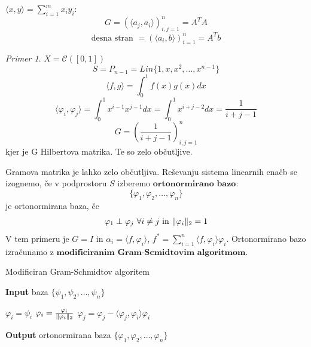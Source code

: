 \documentclass[a4paper,12pt]{article}
\DeclarePairedDelimiter\norm{\lVert}{\rVert}
\newcommand{\innerproduct}[2]{\langle #1, #2 \rangle}
\theoremstyle{definition}
\theoremstyle{remark}
\newtheorem*{ex}{Primer}
\begin{document}
$\innerproduct{x}{y} = \sum_{i = 1}^{m} x_i y_i$:
\begin{equation}
    G = (\innerproduct{a_j}{a_i})_{i, j = 1}^n = A^T A
\end{equation}
\begin{equation}
    \text{desna stran } = (\innerproduct{a_i}{b})_{i = 1}^n = A^Tb
\end{equation}

\begin{ex}
    $X = \mathscr{C} ([0, 1])$
    \begin{equation*}
        S = P_{n-1} = Lin\{1, x, x^2, \dots, x^{n-1}\}
    \end{equation*}
    \begin{equation*}
        \innerproduct{f}{g} = \int_{0}^{1} f(x) g(x) dx
    \end{equation*}
    \begin{equation*}
        \innerproduct{\varphi_i}{\varphi_j} = \int_{0}^{1} x^{i-1} x^{j-1} dx = \int_{0}^{1}x^{i+j-2} dx = \frac{1}{i+j-1}
    \end{equation*}
    \begin{equation*}
        G = (\frac{1}{i+j-1})_{i, j = 1}^n
    \end{equation*}
    kjer je G Hilbertova matrika. Te so zelo občutljive.
\end{ex}


Gramova matrika je lahko zelo občutljiva. Reševanju sistema linearnih enačb se izognemo, če v podprostoru $S$ izberemo $\textbf{ortonormirano bazo}$:
\begin{equation*}
    \{\varphi_1, \varphi_2, \dots, \varphi_n\}
\end{equation*}
je ortonormirana baza, če
\begin{equation*}
    \varphi_1 \perp \varphi_j \text{ } \forall i \neq j \text{ in } \norm{\varphi_i}_2 = 1
\end{equation*}
V tem primeru je $G = I$ in $\alpha_i = \innerproduct{f}{\varphi_i}$,  $f^* = \sum_{i = 1}^{n}\innerproduct{f}{\varphi_i} \varphi_i$. Ortonormirano
bazo izračunamo z $\textbf{modificiranim Gram-Scmidtovim algoritmom}$.

\begin{algorithm}
    \caption{Modificiran Gram-Schmidtov algoritem}\label{alg:mgs}
    \hspace*{\algorithmicindent} \textbf{Input} baza $\{\psi_1, \psi_2, \dots, \psi_n\}$
    \begin{algorithmic}[1]
            \State $\varphi_i = \psi_i$
        \EndFor
            \State $\varphi_i = \frac{\varphi_i}{\norm{\varphi_i}_2}$
                \State $\varphi_j = \varphi_j - \innerproduct{\varphi_j}{\varphi_i}\varphi_i$
            \EndFor
        \EndFor
    \end{algorithmic}
    \hspace*{\algorithmicindent} \textbf{Output} ortonormirana baza $\{\varphi_1, \varphi_2, \dots, \varphi_n\}$
\end{algorithm}
\end{document}
